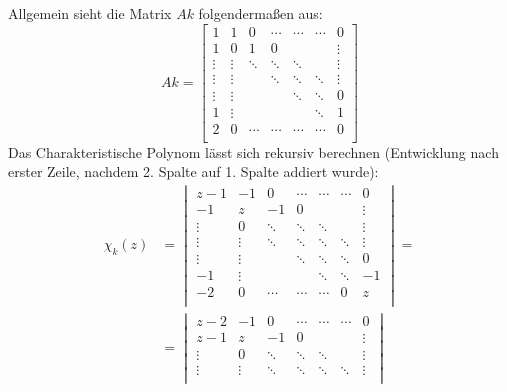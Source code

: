 \begin{flushenum}
\item Allgemein sieht die Matrix $Ak$ folgendermaßen aus:
	\[ Ak = \begin{bmatrix}
			1      & 1      & 0      & \cdots & \cdots & \cdots & 0      \\
			1      & 0      & 1      & 0      &        &        & \vdots \\
			\vdots & \vdots & \ddots & \ddots & \ddots &        & \vdots \\
			\vdots & \vdots &        & \ddots & \ddots & \ddots & \vdots \\
			\vdots & \vdots &        &        & \ddots & \ddots & 0      \\
			1      & \vdots &        &        &        & \ddots & 1      \\
			2      & 0      & \cdots & \cdots & \cdots & \cdots & 0      \\
		\end{bmatrix} \]
	Das Charakteristische Polynom lässt sich rekursiv berechnen (Entwicklung nach erster Zeile,
	nachdem 2. Spalte auf 1. Spalte addiert wurde):
	\begin{equation*}
	\begin{split}
		\chi_k(z) & =
				\begin{vmatrix}
					z-1    & -1     & 0      & \cdots & \cdots & \cdots & 0      \\
					-1     & z      & -1     & 0      &        &        & \vdots \\
					\vdots & 0      & \ddots & \ddots & \ddots &        & \vdots \\
					\vdots & \vdots & \ddots & \ddots & \ddots & \ddots & \vdots \\
					\vdots & \vdots &        & \ddots & \ddots & \ddots & 0      \\
					-1     & \vdots &        &        & \ddots & \ddots & -1     \\
					-2     & 0      & \cdots & \cdots & \cdots & 0      & z      \\
				\end{vmatrix} = \\
			& =
				\begin{vmatrix}
					z-2    & -1     & 0      & \cdots & \cdots & \cdots & 0      \\
					z-1    & z      & -1     & 0      &        &        & \vdots \\
					\vdots & 0      & \ddots & \ddots & \ddots &        & \vdots \\
					\vdots & \vdots & \ddots & \ddots & \ddots & \ddots & \vdots \\

\end{vmatrix}
\end{split}
\end{equation*}
\end{flushenum}
